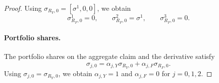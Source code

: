 \begin{proof}
Using $\sigma_{R_Y,0} = [\sigma^1,0,0]$, we obtain
\begin{equation}
    \sigma_{R_F,0}^1 = 0, \qquad 
    \sigma_{R_F,0}^2 = \sigma^1, \qquad 
    \sigma_{R_F,0}^3 = 0.
\end{equation}

\paragraph{Portfolio shares.}
The portfolio shares on the aggregate claim and the derivative satisfy
\begin{equation}
    \sigma_{j,0} = \alpha_{j,Y} \sigma_{R_Y,0} + \alpha_{j,F} \sigma_{R_F,0}.
\end{equation}
Using $\sigma_{j,0} = \sigma_{R_Y,0}$, we obtain $\alpha_{j,Y} = 1$ and $\alpha_{j,F} = 0$ for $j = 0,1,2$.

\end{proof}



